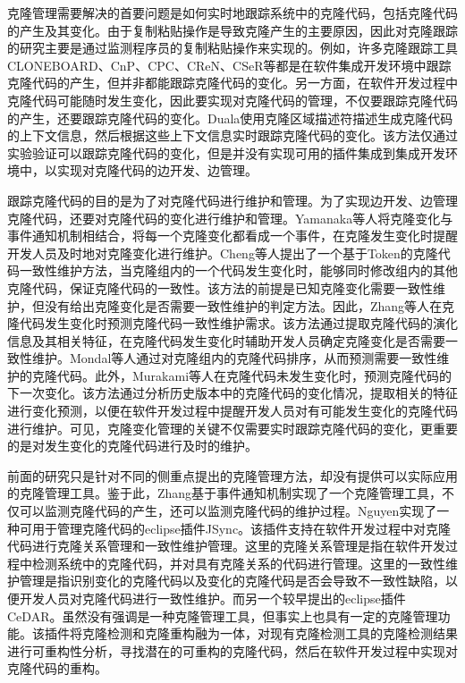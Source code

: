 克隆管理需要解决的首要问题是如何实时地跟踪系统中的克隆代码，包括克隆代码的产生及其变化。由于复制粘贴操作是导致克隆产生的主要原因，因此对克隆跟踪的研究主要是通过监测程序员的复制粘贴操作来实现的。例如，许多克隆跟踪工具CLONEBOARD\cite{de2009managing}、CnP\cite{hou2009cnp}、CPC\cite{weckerle2008cpc}、CReN\cite{jablonski2007cren}、CSeR\cite{jacob2010actively}等都是在软件集成开发环境中跟踪克隆代码的产生，但并非都能跟踪克隆代码的变化。另一方面，在软件开发过程中克隆代码可能随时发生变化，因此要实现对克隆代码的管理，不仅要跟踪克隆代码的产生，还要跟踪克隆代码的变化。Duala使用克隆区域描述符描述生成克隆代码的上下文信息，然后根据这些上下文信息实时跟踪克隆代码的变化\cite{duala2008clonetracker}\cite{duala2010clone}。该方法仅通过实验验证可以跟踪克隆代码的变化，但是并没有实现可用的插件集成到集成开发环境中，以实现对克隆代码的边开发、边管理。

跟踪克隆代码的目的是为了对克隆代码进行维护和管理。为了实现边开发、边管理克隆代码，还要对克隆代码的变化进行维护和管理。Yamanaka等人\cite{yamanaka2013applying}将克隆变化与事件通知机制相结合，将每一个克隆变化都看成一个事件，在克隆发生变化时提醒开发人员及时地对克隆变化进行维护。Cheng等人\cite{cheng2016rule}提出了一个基于Token的克隆代码一致性维护方法，当克隆组内的一个代码发生变化时，能够同时修改组内的其他克隆代码，保证克隆代码的一致性。该方法的前提是已知克隆变化需要一致性维护，但没有给出克隆变化是否需要一致性维护的判定方法。因此，Zhang等人\cite{zhang2016predicting}在克隆代码发生变化时预测克隆代码一致性维护需求。该方法通过提取克隆代码的演化信息及其相关特征，在克隆代码发生变化时辅助开发人员确定克隆变化是否需要一致性维护。Mondal等人通过对克隆组内的克隆代码排序，从而预测需要一致性维护的克隆代码\cite{mondal2014prediction}。此外，Murakami等人在克隆代码未发生变化时，预测克隆代码的下一次变化\cite{murakami2014predicting}。该方法通过分析历史版本中的克隆代码的变化情况，提取相关的特征进行变化预测，以便在软件开发过程中提醒开发人员对有可能发生变化的克隆代码进行维护。可见，克隆变化管理的关键不仅需要实时跟踪克隆代码的变化，更重要的是对发生变化的克隆代码进行及时的维护。

前面的研究只是针对不同的侧重点提出的克隆管理方法，却没有提供可以实际应用的克隆管理工具。鉴于此，Zhang基于事件通知机制实现了一个克隆管理工具，不仅可以监测克隆代码的产生，还可以监测克隆代码的维护过程\cite{zhang2013towards}。Nguyen实现了一种可用于管理克隆代码的eclipse插件JSync\cite{nguyen2012clone}。该插件支持在软件开发过程中对克隆代码进行克隆关系管理和一致性维护管理。这里的克隆关系管理是指在软件开发过程中检测系统中的克隆代码，并对具有克隆关系的代码进行管理。这里的一致性维护管理是指识别变化的克隆代码以及变化的克隆代码是否会导致不一致性缺陷，以便开发人员对克隆代码进行一致性维护。而另一个较早提出的eclipse插件CeDAR\cite{tairas2012increasing}。虽然没有强调是一种克隆管理工具，但事实上也具有一定的克隆管理功能。该插件将克隆检测和克隆重构融为一体，对现有克隆检测工具的克隆检测结果进行可重构性分析，寻找潜在的可重构的克隆代码，然后在软件开发过程中实现对克隆代码的重构。


